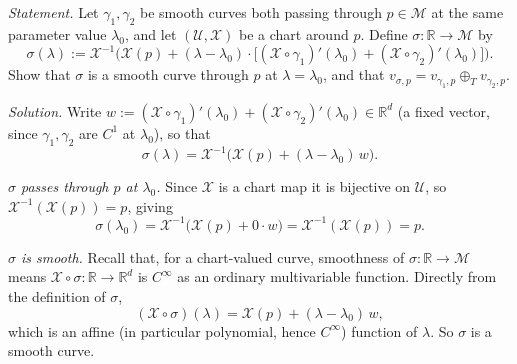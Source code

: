 \documentclass[11pt]{article}
\begin{document}
\noindent\textit{Statement.} Let $\gamma_1,\gamma_2$ be smooth curves both
passing through $p\in\mathcal M$ at the same parameter value $\lambda_0$,
and let $(\mathcal U,\mathcal X)$ be a chart around $p$. Define
$\sigma:\mathbb R\to\mathcal M$ by
\[
\sigma(\lambda):=\mathcal X^{-1}\Big(\mathcal X(p)+(\lambda-\lambda_0)\cdot
\big[(\mathcal X\circ\gamma_1)'(\lambda_0)+(\mathcal X\circ\gamma_2)'
(\lambda_0)\big]\Big).
\]
Show that $\sigma$ is a smooth curve through $p$ at $\lambda=\lambda_0$,
and that $v_{\sigma,p}=v_{\gamma_1,p}\oplus_T v_{\gamma_2,p}$.

\medskip
\noindent\textit{Solution.} Write $w:=(\mathcal X\circ\gamma_1)'(\lambda_0)
+(\mathcal X\circ\gamma_2)'(\lambda_0)\in\mathbb R^d$ (a fixed vector, since
$\gamma_1,\gamma_2$ are $C^1$ at $\lambda_0$), so that
\[
\sigma(\lambda) = \mathcal X^{-1}\big(\mathcal X(p)+(\lambda-\lambda_0)\,w
\big).
\]

\emph{$\sigma$ passes through $p$ at $\lambda_0$.} Since $\mathcal X$ is a
chart map it is bijective on $\mathcal U$, so $\mathcal X^{-1}(\mathcal
X(p))=p$, giving
\[
\sigma(\lambda_0) = \mathcal X^{-1}\big(\mathcal X(p)+0\cdot w\big) =
\mathcal X^{-1}(\mathcal X(p)) = p.
\]

\emph{$\sigma$ is smooth.} Recall that, for a chart-valued curve, smoothness
of $\sigma:\mathbb R\to\mathcal M$ means $\mathcal X\circ\sigma:\mathbb
R\to\mathbb R^d$ is $C^\infty$ as an ordinary multivariable function.
Directly from the definition of $\sigma$,
\[
(\mathcal X\circ\sigma)(\lambda) = \mathcal X(p) + (\lambda-\lambda_0)\,w,
\]
which is an affine (in particular polynomial, hence $C^\infty$) function of
$\lambda$. So $\sigma$ is a smooth curve.
\end{document}
